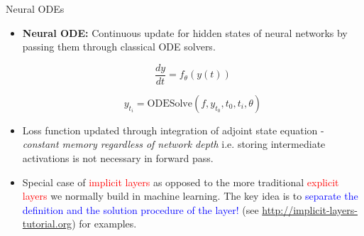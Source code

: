 \documentclass{beamer}
\begin{document}
\begin{frame}{Neural ODEs}
    \begin{itemize}
        \item \textbf{Neural ODE:} Continuous update for hidden states of neural networks by passing them through classical ODE solvers. 

        $$\frac{dy}{dt} = f_{\theta}(y(t))$$

        $$y_{t_i} = \textrm{ODESolve}(f, y_{t_0}, t_0, t_i, \theta)$$
    
        \item Loss function updated through integration of adjoint state equation - \emph{constant memory regardless of network depth} i.e. storing intermediate activations is not necessary in forward pass.

        \item Special case of \textcolor{red}{implicit layers} as opposed to the more traditional \textcolor{red}{explicit layers} we normally build in machine learning. The key idea is to \textcolor{blue}{separate the definition and the solution procedure of the layer!} (see \url{http://implicit-layers-tutorial.org}) for examples.
    \end{itemize}
\end{frame}
\end{document}
